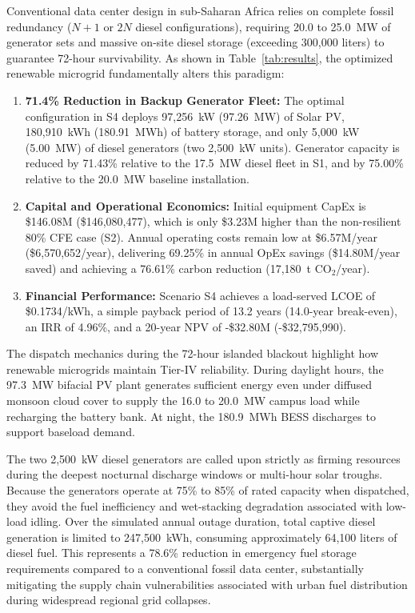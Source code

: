 \documentclass[11pt,a4paper]{article}
\begin{document}
Conventional data center design in sub-Saharan Africa relies on complete fossil redundancy ($N+1$ or $2N$ diesel configurations), requiring 20.0 to 25.0~MW of generator sets and massive on-site diesel storage (exceeding 300,000 liters) to guarantee 72-hour survivability. As shown in Table~\ref{tab:results}, the optimized renewable microgrid fundamentally alters this paradigm:
\begin{enumerate}
    \item \textbf{71.4\% Reduction in Backup Generator Fleet:} The optimal configuration in S4 deploys 97,256~kW (97.26~MW) of Solar PV, 180,910~kWh (180.91~MWh) of battery storage, and only 5,000~kW (5.00~MW) of diesel generators (two 2,500~kW units). Generator capacity is reduced by 71.43\% relative to the 17.5~MW diesel fleet in S1, and by 75.00\% relative to the 20.0~MW baseline installation.
    \item \textbf{Capital and Operational Economics:} Initial equipment CapEx is \$146.08M (\$146,080,477), which is only \$3.23M higher than the non-resilient 80\% CFE case (S2). Annual operating costs remain low at \$6.57M/year (\$6,570,652/year), delivering 69.25\% in annual OpEx savings (\$14.80M/year saved) and achieving a 76.61\% carbon reduction (17,180~t CO$_2$/year).
    \item \textbf{Financial Performance:} Scenario S4 achieves a load-served LCOE of \$0.1734/kWh, a simple payback period of 13.2 years (14.0-year break-even), an IRR of 4.96\%, and a 20-year NPV of -\$32.80M (-\$32,795,990).
\end{enumerate}

The dispatch mechanics during the 72-hour islanded blackout highlight how renewable microgrids maintain Tier-IV reliability. During daylight hours, the 97.3~MW bifacial PV plant generates sufficient energy even under diffused monsoon cloud cover to supply the 16.0 to 20.0~MW campus load while recharging the battery bank. At night, the 180.9~MWh BESS discharges to support baseload demand.

The two 2,500~kW diesel generators are called upon strictly as firming resources during the deepest nocturnal discharge windows or multi-hour solar troughs. Because the generators operate at 75\% to 85\% of rated capacity when dispatched, they avoid the fuel inefficiency and wet-stacking degradation associated with low-load idling. Over the simulated annual outage duration, total captive diesel generation is limited to 247,500~kWh, consuming approximately 64,100 liters of diesel fuel. This represents a 78.6\% reduction in emergency fuel storage requirements compared to a conventional fossil data center, substantially mitigating the supply chain vulnerabilities associated with urban fuel distribution during widespread regional grid collapses.
\end{document}
